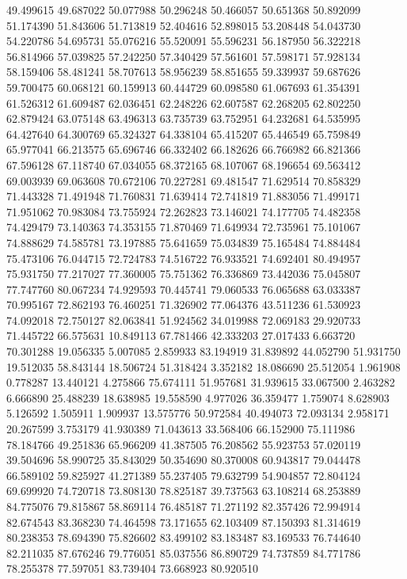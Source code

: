 49.499615
49.687022
50.077988
50.296248
50.466057
50.651368
50.892099
51.174390
51.843606
51.713819
52.404616
52.898015
53.208448
54.043730
54.220786
54.695731
55.076216
55.520091
55.596231
56.187950
56.322218
56.814966
57.039825
57.242250
57.340429
57.561601
57.598171
57.928134
58.159406
58.481241
58.707613
58.956239
58.851655
59.339937
59.687626
59.700475
60.068121
60.159913
60.444729
60.098580
61.067693
61.354391
61.526312
61.609487
62.036451
62.248226
62.607587
62.268205
62.802250
62.879424
63.075148
63.496313
63.735739
63.752951
64.232681
64.535995
64.427640
64.300769
65.324327
64.338104
65.415207
65.446549
65.759849
65.977041
66.213575
65.696746
66.332402
66.182626
66.766982
66.821366
67.596128
67.118740
67.034055
68.372165
68.107067
68.196654
69.563412
69.003939
69.063608
70.672106
70.227281
69.481547
71.629514
70.858329
71.443328
71.491948
71.760831
71.639414
72.741819
71.883056
71.499171
71.951062
70.983084
73.755924
72.262823
73.146021
74.177705
74.482358
74.429479
73.140363
74.353155
71.870469
71.649934
72.735961
75.101067
74.888629
74.585781
73.197885
75.641659
75.034839
75.165484
74.884484
75.473106
76.044715
72.724783
74.516722
76.933521
74.692401
80.494957
75.931750
77.217027
77.360005
75.751362
76.336869
73.442036
75.045807
77.747760
80.067234
74.929593
70.445741
79.060533
76.065688
63.033387
70.995167
72.862193
76.460251
71.326902
77.064376
43.511236
61.530923
74.092018
72.750127
82.063841
51.924562
34.019988
72.069183
29.920733
71.445722
66.575631
10.849113
67.781466
42.333203
27.017433
6.663720
70.301288
19.056335
5.007085
2.859933
83.194919
31.839892
44.052790
51.931750
19.512035
58.843144
18.506724
51.318424
3.352182
18.086690
25.512054
1.961908
0.778287
13.440121
4.275866
75.674111
51.957681
31.939615
33.067500
2.463282
6.666890
25.488239
18.638985
19.558590
4.977026
36.359477
1.759074
8.628903
5.126592
1.505911
1.909937
13.575776
50.972584
40.494073
72.093134
2.958171
20.267599
3.753179
41.930389
71.043613
33.568406
66.152900
75.111986
78.184766
49.251836
65.966209
41.387505
76.208562
55.923753
57.020119
39.504696
58.990725
35.843029
50.354690
80.370008
60.943817
79.044478
66.589102
59.825927
41.271389
55.237405
79.632799
54.904857
72.804124
69.699920
74.720718
73.808130
78.825187
39.737563
63.108214
68.253889
84.775076
79.815867
58.869114
76.485187
71.271192
82.357426
72.994914
82.674543
83.368230
74.464598
73.171655
62.103409
87.150393
81.314619
80.238353
78.694390
75.826602
83.499102
83.183487
83.169533
76.744640
82.211035
87.676246
79.776051
85.037556
86.890729
74.737859
84.771786
78.255378
77.597051
83.739404
73.668923
80.920510

